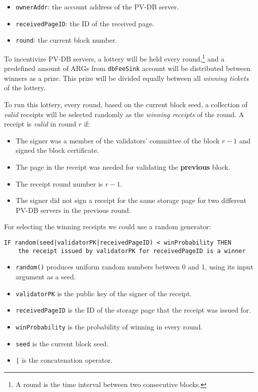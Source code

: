 \begin{itemize}
    \item \texttt{ownerAddr}: the account address of the PV-DB server.
    \item \texttt{receivedPageID}: the ID of the received page.
    \item \texttt{round}: the current block number.
\end{itemize}


To incentivize PV-DB servers, a lottery will be held every round,\footnote{A round is the time interval between
two consecutive blocks.} and a predefined amount of ARGs from
\texttt{dbFeeSink} account will be distributed between winners as a prize. This prize will be divided equally
between all \emph{winning tickets} of the lottery.


To run this lottery, every round, based on the current block seed, a collection of \emph{valid} receipts will be
selected randomly as the \emph{winning receipts} of the round. A receipt is \emph{valid} in round $r$ if:

\begin{itemize}
    \item The signer was a member of the validators' committee of the block $r - 1$ and signed the block certificate.
    \item The page in the receipt was needed for validating the \textbf{previous} block.
    \item The receipt round number is $r - 1$.
    \item The signer did not sign a receipt for the same storage page for two different PV-DB servers in
    the previous round.
\end{itemize}
For selecting the winning receipts we could use a random generator:
\begin{verbatim}
IF random(seed|validatorPK|receivedPageID) < winProbability THEN
    the receipt issued by validatorPK for receivedPageID is a winner
\end{verbatim}
\begin{itemize}
    \item \texttt{random()} produces uniform random numbers between 0 and 1, using its input argument as a seed.
    \item \texttt{validatorPK} is the public key of the signer of the receipt.
    \item \texttt{receivedPageID} is the ID of the storage page that the receipt was issued for.
    \item \texttt{winProbability} is the probability of winning in every round.
    \item \texttt{seed} is the current block seed.
    \item \texttt{|} is the concatenation operator.
\end{itemize}

